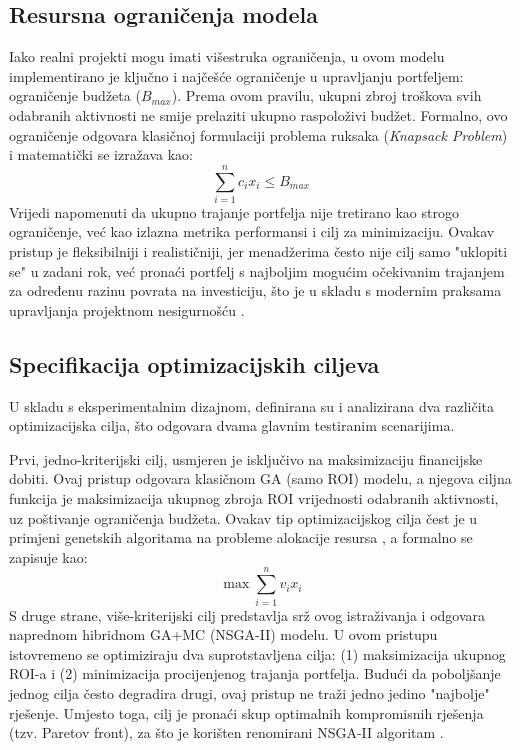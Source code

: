 \subsection{Resursna ograničenja modela}
Iako realni projekti mogu imati višestruka ograničenja, u ovom modelu implementirano je ključno i najčešće ograničenje u upravljanju portfeljem: ograničenje budžeta ($B_{max}$). Prema ovom pravilu, ukupni zbroj troškova svih odabranih aktivnosti ne smije prelaziti ukupno raspoloživi budžet. Formalno, ovo ograničenje odgovara klasičnoj formulaciji problema ruksaka (\textit{Knapsack Problem}) \cite{Kellerer2004} i matematički se izražava kao:
$$
\sum_{i=1}^n c_i x_i \leq B_{max}
$$
Vrijedi napomenuti da ukupno trajanje portfelja nije tretirano kao strogo ograničenje, već kao izlazna metrika performansi i cilj za minimizaciju. Ovakav pristup je fleksibilniji i realističniji, jer menadžerima često nije cilj samo "uklopiti se" u zadani rok, već pronaći portfelj s najboljim mogućim očekivanim trajanjem za određenu razinu povrata na investiciju, što je u skladu s modernim praksama upravljanja projektnom nesigurnošću \cite{Smith2014}.

\subsection{Specifikacija optimizacijskih ciljeva}
U skladu s eksperimentalnim dizajnom, definirana su i analizirana dva različita optimizacijska cilja, što odgovara dvama glavnim testiranim scenarijima.

Prvi, jedno-kriterijski cilj, usmjeren je isključivo na maksimizaciju financijske dobiti. Ovaj pristup odgovara klasičnom GA (samo ROI) modelu, a njegova ciljna funkcija je maksimizacija ukupnog zbroja ROI vrijednosti odabranih aktivnosti, uz poštivanje ograničenja budžeta. Ovakav tip optimizacijskog cilja čest je u primjeni genetskih algoritama na probleme alokacije resursa \cite{Goldberg1989}, a formalno se zapisuje kao:
$$
\max \sum_{i=1}^n v_i x_i
$$
S druge strane, više-kriterijski cilj predstavlja srž ovog istraživanja i odgovara naprednom hibridnom GA+MC (NSGA-II) modelu. U ovom pristupu istovremeno se optimiziraju dva suprotstavljena cilja: (1) maksimizacija ukupnog ROI-a i (2) minimizacija procijenjenog trajanja portfelja. Budući da poboljšanje jednog cilja često degradira drugi, ovaj pristup ne traži jedno jedino "najbolje" rješenje. Umjesto toga, cilj je pronaći skup optimalnih kompromisnih rješenja (tzv. Paretov front), za što je korišten renomirani NSGA-II algoritam \cite{Deb2002}.

